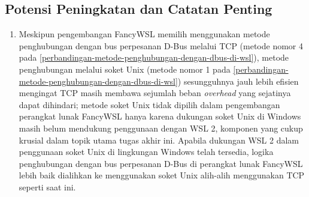\subsection{Potensi Peningkatan dan Catatan Penting}

\begin{enumerate}
    \item Meskipun pengembangan FancyWSL memilih menggunakan metode penghubungan dengan bus perpesanan D-Bus melalui TCP (metode nomor 4 pada \autoref{perbandingan-metode-penghubungan-dengan-dbus-di-wsl}), metode penghubungan melalui soket Unix (metode nomor 1 pada \autoref{perbandingan-metode-penghubungan-dengan-dbus-di-wsl}) sesungguhnya jauh lebih efisien mengingat TCP masih membawa sejumlah beban \textit{overhead} yang sejatinya dapat dihindari; metode soket Unix tidak dipilih dalam pengembangan perangkat lunak FancyWSL hanya karena dukungan soket Unix di Windows masih belum mendukung penggunaan dengan WSL 2, komponen yang cukup krusial dalam topik utama tugas akhir ini. Apabila dukungan WSL 2 dalam penggunaan soket Unix di lingkungan Windows telah tersedia, logika penghubungan dengan bus perpesanan D-Bus di perangkat lunak FancyWSL lebih baik dialihkan ke menggunakan soket Unix alih-alih menggunakan TCP seperti saat ini.
\end{enumerate}
